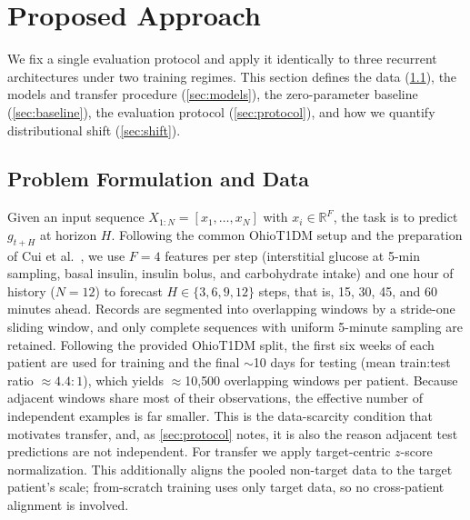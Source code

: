 \documentclass[conference]{IEEEtran}
\begin{document}
\section{Proposed Approach}
\label{sec:approach}

We fix a single evaluation protocol and apply it identically to three recurrent
architectures under two training regimes. This section defines the data
(\ref{sec:data}), the models and transfer procedure (\ref{sec:models}), the
zero-parameter baseline (\ref{sec:baseline}), the evaluation protocol
(\ref{sec:protocol}), and how we quantify distributional shift (\ref{sec:shift}).

\subsection{Problem Formulation and Data}
\label{sec:data}
Given an input sequence $X_{1:N}=[x_1,\dots,x_N]$ with $x_i\in\mathbb{R}^F$, the
task is to predict $g_{t+H}$ at horizon $H$. Following the common OhioT1DM setup
and the preparation of Cui et al.~\cite{CUI9474665}, we use $F=4$ features per step
(interstitial glucose at 5-min sampling, basal insulin, insulin bolus, and
carbohydrate intake) and one hour of history ($N=12$) to forecast
$H\in\{3,6,9,12\}$ steps, that is, 15, 30, 45, and 60 minutes ahead. Records are
segmented into overlapping windows by a stride-one sliding window, and only
complete sequences with uniform 5-minute sampling are retained. Following the
provided OhioT1DM split, the first six weeks of each patient are used for training
and the final $\sim$10 days for testing (mean train:test ratio ${\approx}4.4{:}1$),
which yields $\approx$10{,}500 overlapping windows per patient. Because adjacent
windows share most of their observations, the effective number of independent
examples is far smaller. This is the data-scarcity condition that motivates
transfer, and, as \ref{sec:protocol} notes, it is also the reason adjacent test
predictions are not independent. For transfer we apply target-centric $z$-score
normalization. This additionally aligns the pooled non-target data to the target patient's scale; from-scratch training uses only target data, so no cross-patient alignment is involved.


\end{document}
